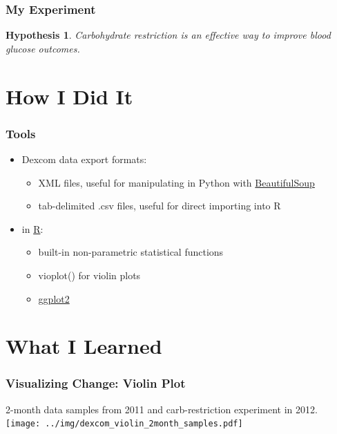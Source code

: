 \documentclass{beamer}
\newtheorem{hypothesis}{Hypothesis}
\begin{document}
\begin{frame}
  \frametitle{My Experiment}

  \begin{hypothesis}
    Carbohydrate restriction is an effective way to improve blood glucose outcomes.
  \end{hypothesis}

\end{frame}

\section{How I Did It}

\begin{frame}
  \frametitle{Tools}
  
  \begin{itemize}
  \item Dexcom data export formats:
    \begin{itemize}
    \item XML files, useful for manipulating in Python with \href{http://www.crummy.com/software/BeautifulSoup/}{BeautifulSoup}
    \item tab-delimited .csv files, useful for direct importing into R
    \end{itemize}
  \item in \href{http://www.r-project.org/}{R}:
    \begin{itemize}
    \item built-in non-parametric statistical functions
    \item vioplot() for violin plots
    \item \href{http://had.co.nz/ggplot2/}{ggplot2}
    \end{itemize}
  \end{itemize}
\end{frame}

\section{What I Learned}

\begin{frame}
  \frametitle{Visualizing Change: Violin Plot}

  \begin{center}
  2-month data samples from 2011 and carb-restriction experiment in 2012.
    \texttt{[image: ../img/dexcom\_violin\_2month\_samples.pdf]}
  \end{center}

\end{frame}
\end{document}
